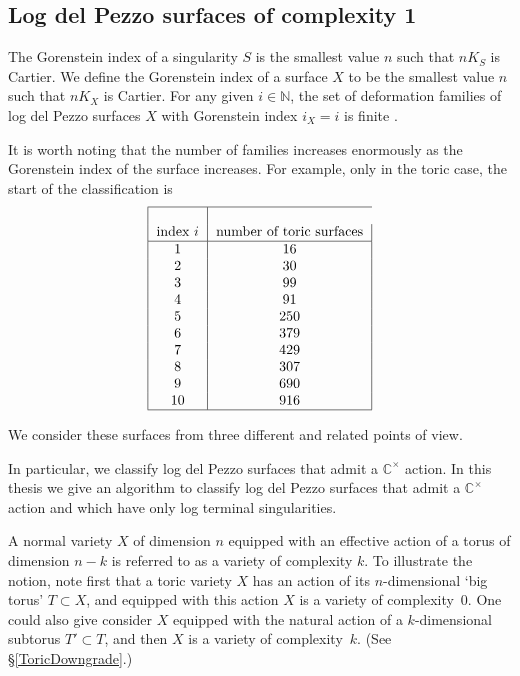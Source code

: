 \documentclass[12pt,a4paper]{book}      %
\theoremstyle{definition}
\begin{document}
\subsection{Log del Pezzo surfaces of complexity 1}
The Gorenstein index of a singularity $S$ is the smallest value $n$ such that $n K_S$ is Cartier. We define the Gorenstein index of a surface $X$ to be the smallest value $n$ such that $nK_X$ is Cartier.
For any given $i \in \mathbb{N}$, the set of deformation
families of log del Pezzo surfaces $X$ with Gorenstein index $i_X=i$
is finite \cite{f}.

It is worth noting that the number of families increases enormously as the Gorenstein
index of the surface increases. For example, only in the toric case, 
the start of the classification is
\[
\begin{tabular}{| c | c |}
\hline\\
\text{index $i$} & \text{number of toric surfaces}\\ \hline
1 & 16 \\
2 & 30 \\
3 & 99  \\
4 & 91  \\
5 & 250 \\
6 & 379 \\
7 & 429 \\
8 & 307 \\
9 & 690 \\
10 & 916 \\
\hline
\end{tabular}
\]

We consider these surfaces from three different and related points of view.

In particular, we classify log del Pezzo surfaces that admit a $\mathbb{C}^\times$ action.
In this thesis we give an algorithm to classify log del Pezzo surfaces that admit a $\mathbb{C}^\times$ action and which have only log terminal singularities. 


A normal variety $X$ of dimension $n$ equipped with an effective action of a torus of dimension $n-k$ is referred to as a variety of complexity $k$. To illustrate the notion, note first that a toric variety $X$ has an action of its $n$-dimensional `big torus' $T\subset X$, and equipped with this action $X$ is a variety of complexity~0.
One could also give consider $X$ equipped with the natural action of a $k$-dimensional
subtorus $T'\subset T$, and then $X$ is a variety of complexity~$k$. (See \S\ref{ToricDowngrade}.)
\end{document}
